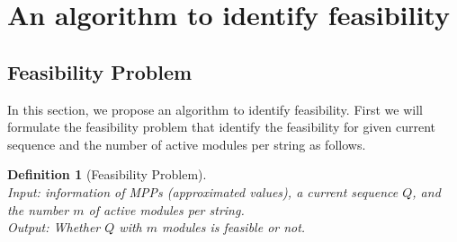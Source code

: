\documentclass[conference]{IEEEtran}
\newtheorem{definition}{Definition}
\begin{document}

\section{An algorithm to identify feasibility}\label{Sec5}
\subsection{Feasibility Problem}\label{Sec5_1}
In this section, we propose an algorithm to identify feasibility.
First we will formulate the feasibility problem that identify the feasibility for given current sequence and the number of active modules per string as follows.
\begin{definition}[Feasibility Problem]\\
Input: information of MPPs (approximated values), a current sequence $Q$, and the number $m$ of active modules per string.\\
Output: Whether $Q$ with $m$ modules is feasible or not.
\end{definition}
\end{document}
